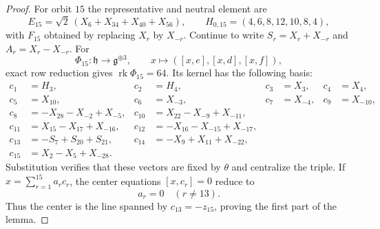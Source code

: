 \documentclass[11pt,reqno]{amsart}
\numberwithin{equation}{section}
\theoremstyle{definition}
\theoremstyle{remark}
\newcommand{\rk}{\operatorname{rk}}
\newcommand{\fg}{\mathfrak g}
\newcommand{\fh}{\mathfrak h}
\begin{document}
\begin{proof}
For orbit $15$ the representative and neutral element are
\[
 E_{15}=\sqrt2\,(X_6+X_{34}+X_{40}+X_{56}),
 \qquad
 H_{0,15}=(4,6,8,12,10,8,4),
\]
with $F_{15}$ obtained by replacing $X_r$ by $X_{-r}$.  Continue to write
$S_r=X_r+X_{-r}$ and $A_r=X_r-X_{-r}$.  For
\[
 \Phi_{15}:\fh\longrightarrow\fg^{\oplus3},\qquad
 x\longmapsto([x,e],[x,d],[x,f]),
\]
exact row reduction gives $\rk\Phi_{15}=64$.  Its kernel has the following
basis:
\begingroup
\small
\begin{align*}
 c_1&=H_3,&c_2&=H_4,&c_3&=X_3,&c_4&=X_4,\\
 c_5&=X_{10},&c_6&=X_{-3},&c_7&=X_{-4},&c_9&=X_{-10},\\
 c_8&=-X_{28}-X_{-2}+X_{-5},
 &c_{10}&=X_{22}-X_{-9}+X_{-11},\\
 c_{11}&=X_{15}-X_{17}+X_{-16},
 &c_{12}&=-X_{16}-X_{-15}+X_{-17},\\
 c_{13}&=-S_7+S_{20}+S_{21},
 &c_{14}&=-X_9+X_{11}+X_{-22},\\
 c_{15}&=X_2-X_5+X_{-28}.
\end{align*}
\endgroup
Substitution verifies that these vectors are fixed by $\theta$ and centralize
the triple.  If $x=\sum_{r=1}^{15}a_rc_r$, the center equations
$[x,c_r]=0$ reduce to
\[
 a_r=0\quad(r\neq13).
\]
Thus the center is the line spanned by $c_{13}=-z_{15}$, proving the first
part of the lemma.


\end{proof}
\end{document}
